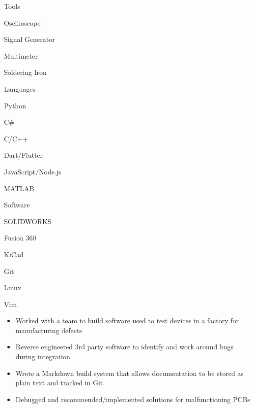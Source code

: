 \documentclass{resume}
\author{Jasper Chan}
\begin{document}
\maketitle

\vspace{-1em} %
\TechnicalSkills

\begin{TechSkills}{Tools}
    \item Oscilloscope
    \item Signal Generator
    \item Multimeter
    \item Soldering Iron
\end{TechSkills}
\begin{TechSkills}{Languages}
    \item Python
    \item C\#
    \item C/C++
    \item Dart/Flutter
    \item JavaScript/Node.js
    \item MATLAB
\end{TechSkills}
\begin{TechSkills}{Software}
    \item SOLIDWORKS
    \item Fusion 360
    \item KiCad
    \item Git
    \item Linux
    \item Vim
\end{TechSkills}

\WorkExperience

\begin{itemize}
    \item Worked with a team to build software used to test devices in a factory for manufacturing defects
    \item Reverse engineered 3rd party software to identify and work around bugs during integration
    \item Wrote a Markdown build system that allows documentation to be stored as plain text and tracked in Git
    \item Debugged and recommended/implemented solutions for malfunctioning PCBs
\end{itemize}
\end{document}
